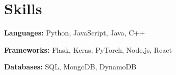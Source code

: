 \section{Skills}
 \resumeSubHeadingListStart
   \item{
     \textbf{Languages: }{Python, JavaScript, Java, C++}
   } \vspace{-6px}
   \item{
      \textbf{Frameworks: }{Flask, Keras, PyTorch, Node.js, React}
   } \vspace{-6px}
   \item{
      \textbf{Databases: }{SQL, MongoDB, DynamoDB}
   }
 \resumeSubHeadingListEnd